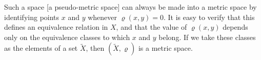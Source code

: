 Such a space [a pseudo-metric space] can always be made into a metric space by identifying points $x$ and $y$ whenever $\varrho(x, y) = 0$. It is easy to verify that this defines an equivalence relation in $X$, and that the value of $\varrho(x, y)$ depends only on the equivalence classes to which $x$ and $y$ belong. If we take these classes as the elements of a set $\tilde{X}$, then $(\tilde{X}, \varrho)$ is a metric space.
